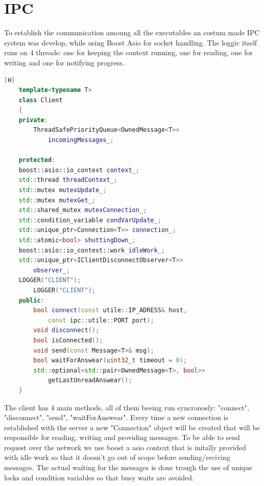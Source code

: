 \documentclass[17pt]{report}
\begin{document}
\pagebreak
\section{IPC}
\indent \indent
To establish the communication amoung all the executables an costum made IPC system
was develop, while using Boost Asio for socket handling. The loggic 
itself runs on 4 threads: one for keeping the context running, one for reading,
one for writing and one for notifying progress.

\begin{lstlisting}[language = C++][H]
    template<typename T>
    class Client
    {
    private:
        ThreadSafePriorityQueue<OwnedMessage<T>>
            incomingMessages_;

    protected:
    boost::asio::io_context context_;
    std::thread threadContext_;
    std::mutex mutexUpdate_;
    std::mutex mutexGet_;
    std::shared_mutex mutexConnection_;
    std::condition_variable condVarUpdate_;
    std::unique_ptr<Connection<T>> connection_;
    std::atomic<bool> shuttingDown_;
    boost::asio::io_context::work idleWork_; 
    std::unique_ptr<IClientDisconnectObserver<T>> 
        observer_; 
    LOGGER("CLIENT");
        LOGGER("CLIENT");
    public:
        bool connect(const utile::IP_ADRESS& host,
            const ipc::utile::PORT port);
        void disconnect();
        bool isConnected();
        void send(const Message<T>& msg);
        bool waitForAnswear(uint32_t timeout = 0);
        std::optional<std::pair<OwnedMessage<T>, bool>>
            getLastUnreadAnswear();
    }
\end{lstlisting}

The client has 4 main methods, all of them beeing run syncronosly:
"connect", "disconnect", "send", "waitForAnswear". Every time a 
new connection is established with the server a new "Connection"
object will be created that will be responsible for reading, writing 
and providing messages. To be able to send request over the network
we use boost a asio context that is initally provided with idle work 
so that it doesn't go out of scope before sending/reciving messages. 
The actual waiting for the messages is done trough the use of unique 
locks and condition variables so that busy waits are avoided.
\pagebreak
\end{document}
